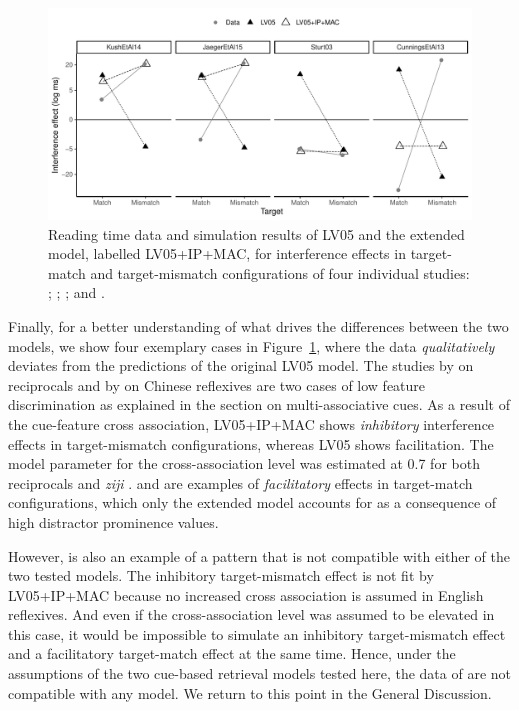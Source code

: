 \documentclass{cambridge7A}\usepackage[]{graphicx}\usepackage[]{color}
\begin{document}
\begin{figure}[htbp]
\centering
\includegraphics[width=\textwidth]{figures/fig-simresultsSlct}

  \caption{Reading time data and simulation results of LV05 and the extended model, labelled LV05+IP+MAC, for interference effects in target-match and target-mismatch configurations of four individual studies: \cite{KushPhillips2014}; \cite[][Exp.\ 1]{JaegerEngelmannVasishth2015}; \cite[][Exp.\ 1]{Sturt2003}; and \cite[][Exp.\ 2, participants with low working memory]{CunningsFelser2013}.
  }
  \label{fig:simresultsSlct} 
\end{figure}
%

Finally, for a better understanding of what drives the differences between the two models, we show four exemplary cases in Figure~\ref{fig:simresultsSlct}, where the data \emph{qualitatively} deviates from the predictions of the original LV05 model. 
The studies by \cite{KushPhillips2014} on reciprocals and by \cite{JaegerEngelmannVasishth2015} on Chinese reflexives are two cases of low feature discrimination as explained in the section on multi-associative cues. As a result of the cue-feature cross association, LV05+IP+MAC shows \emph{inhibitory} interference effects in target-mismatch configurations, whereas LV05 shows facilitation. 
The model parameter for the cross-association level was estimated at 0.7 for both reciprocals \citep{KushPhillips2014} and \textit{ziji} \citep{JaegerEngelmannVasishth2015}.
\cite{CunningsFelser2013} and \cite{Sturt2003} are examples of \emph{facilitatory} effects in target-match configurations, which only the extended model accounts for as a consequence of high distractor prominence values.

However, \cite{CunningsFelser2013} is also an example of a pattern that is not compatible with either of the two tested models. The inhibitory target-mismatch effect is not fit by LV05+IP+MAC because no increased cross association is assumed in English reflexives. And even if the cross-association level was assumed to be elevated in this case, it would be impossible to simulate an inhibitory target-mismatch effect and a facilitatory target-match effect at the same time. 
Hence, under the assumptions of the two cue-based retrieval models tested here, the data of \cite{CunningsFelser2013} are not compatible with any model. We return to this point in the General Discussion.
\end{document}
